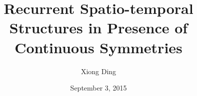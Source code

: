 \documentclass[reqno,11pt,oneside]{article}
\begin{document}
\title{Recurrent Spatio-temporal Structures in Presence of Continuous Symmetries}
\author{Xiong Ding}
\date{September 3, 2015}
\maketitle

\begin{abstract}

\end{abstract}





\end{document}
